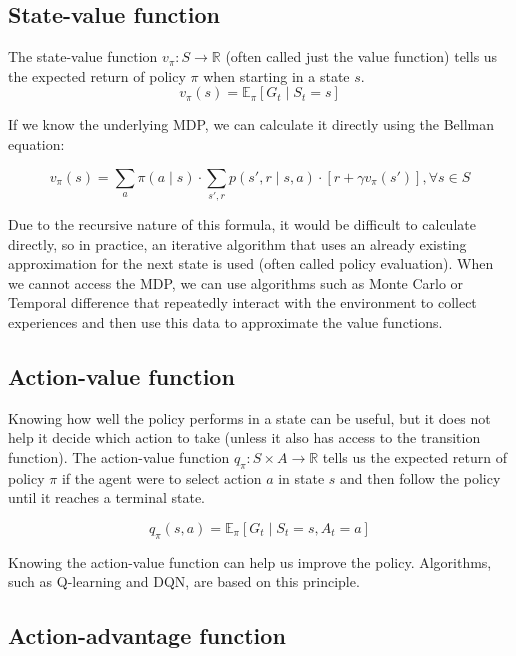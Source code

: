 \documentclass[
  digital,     %
  oneside,     %
  nosansbold,  %
  nocolorbold, %
  lof,         %
  lot,         %
]{fithesis4}
\begin{document}
\subsection{State-value function}
\label{subsec:state_value_func}
The state-value function $v_\pi\colon S\to \mathbb{R}$ (often called just the value function) tells us the expected return of policy $\pi$ when starting in a state $s$.
\begin{equation}
v_\pi(s) = \mathbb{E}_\pi [G_t\mid S_t=s]
\end{equation}

If we know the underlying MDP, we can calculate it directly using the Bellman equation:

\begin{equation}
v_\pi(s) = \sum_a \pi(a\mid s) \cdot \sum_{s',r} p(s',r\mid s,a)\cdot[r+\gamma v_\pi(s')], \forall s \in S
\end{equation}

Due to the recursive nature of this formula, it would be difficult to calculate directly, so in practice, an iterative algorithm that uses an already existing approximation for the next state is used (often called policy evaluation). When we cannot access the MDP, we can use algorithms such as Monte Carlo or Temporal difference that repeatedly interact with the environment to collect experiences and then use this data to approximate the value functions.

\subsection{Action-value function}

Knowing how well the policy performs in a state can be useful, but it does not help it decide which action to take (unless it also has access to the transition function). The action-value function $q_\pi\colon S \times A \to \mathbb{R}$ tells us the expected return of policy $\pi$ if the agent were to select action $a$ in state $s$ and then follow the policy until it reaches a terminal state.

\begin{equation}
q_\pi(s,a) = \mathbb{E}_\pi [G_t\mid S_t=s,A_t=a]
\end{equation}

Knowing the action-value function can help us improve the policy. Algorithms, such as Q-learning and DQN, are based on this principle.

\subsection{Action-advantage function}
\end{document}
